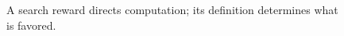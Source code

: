 \begin{figure}[H]
\centering
{}
\caption{A search reward directs computation; its definition determines what is favored.}\label{fig:teach-M05-07}
\end{figure}
